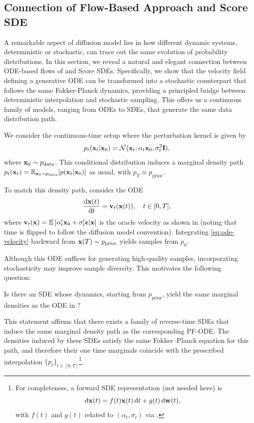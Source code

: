 \subsection{Connection of Flow-Based Approach and Score SDE}\label{subsec:flow-score}

A remarkable aspect of diffusion model lies in how different dynamic systems, deterministic or stochastic, can trace out the same evolution of probability distributions. In this section, we reveal a natural and elegant connection between ODE-based flows of  and Score SDEs. Specifically, we show that the velocity field defining a generative ODE can be transformed into a stochastic counterpart that follows the same Fokker-Planck dynamics, providing a principled bridge between deterministic interpolation and stochastic sampling. This offers us a continuous family of models, ranging from ODEs to SDEs, that generate the same data distribution path.

We consider the continuous-time setup where the perturbation kernel is given by
\[
p_t({\mathbf{x}}_t|{\mathbf{x}}_0) = \mathcal{N}({\mathbf{x}}_t; \alpha_t {\mathbf{x}}_0, \sigma_t^2 {\mathbf{I}}),
\]
where ${\mathbf{x}}_0 \sim p_{\mathrm{data}}$. This conditional distribution induces a marginal density path $p_t({\mathbf{x}}_t) = \mathbb{E}_{{\mathbf{x}}_0 \sim p_{\mathrm{data}}}[p({\mathbf{x}}_t|{\mathbf{x}}_0)]$ as usual, with $p_T\approx p_{\mathrm{prior}}$.

To match this density path, consider the ODE
\begin{align}\label{eq:ode-velocity}
    \frac{\mathop{}\!\mathrm{d}{\mathbf{x}}(t)}{\mathop{}\!\mathrm{d} t} = \mathbf{v}_t({\mathbf{x}}(t)), \quad t \in [0,T],
\end{align}
where $\mathbf{v}_t({\mathbf{x}}) =\mathbb{E}\left[\alpha_t'{\mathbf{x}}_0+\sigma_t'{\bm{\epsilon}}|{\mathbf{x}}\right]$ is the oracle velocity  as shown in  (noting that time is flipped to follow the diffusion model convention). Integrating \eqref{eq:ode-velocity} backward from ${\mathbf{x}}(T)\sim p_{\mathrm{prior}}$ yields samples from $p_0$.

Although this ODE suffices for generating high-quality samples, incorporating stochasticity may improve sample diversity. This motivates the following question:
\begin{question}
Is there an SDE whose dynamics, starting from $p_{\mathrm{prior}}$, yield the same marginal densities as the ODE in ?
\end{question}
This statement affirms that there exists a family of reverse-time SDEs that induce the same marginal density path as the corresponding PF-ODE.  
 The densities induced by these SDEs satisfy the same Fokker–Planck equation for this path, and therefore their one time marginals coincide with the prescribed interpolation $\{p_t\}_{t\in[0,T]}$\footnote{For completeness, a forward SDE representation (not needed here) is
\[
\mathop{}\!\mathrm{d} {\mathbf{x}}(t)=f(t) {\mathbf{x}}(t) \mathop{}\!\mathrm{d} t+g(t) \mathop{}\!\mathrm{d} {\mathbf{w}}(t),
\]
with $f(t)$ and $g(t)$ related to $(\alpha_t,\sigma_t)$ via .}.


